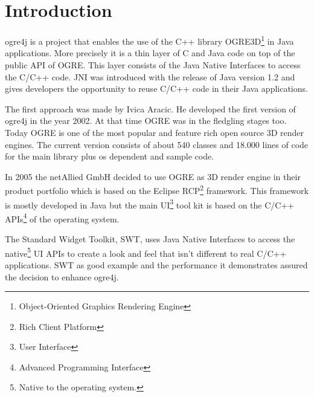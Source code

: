 \section{Introduction}
\label{Introduction}
ogre4j is a project that enables the use of the C++ library 
OGRE3D\footnote{Object-Oriented Graphics Rendering Engine} in Java 
applications. More precisely it is a thin layer of C and Java code on top of the 
public API of OGRE. This layer consists of the Java Native Interfaces to access 
the C/C++ code. JNI was introduced with the release of Java version 1.2 and 
gives developers the opportunity to reuse C/C++ code in their Java applications. 

The first approach was made by Ivica Aracic. He developed the first version of 
ogre4j in the year 2002. At that time OGRE was in the fledgling stages too. 
Today OGRE is one of the most popular and feature rich open source 3D render 
engines. The current version consists of about 540 classes and 18.000 lines of 
code for the main library plus os dependent and sample code.

In 2005 the netAllied GmbH decided to use OGRE as 3D render 
engine in their product portfolio which is based on the Eclipse 
RCP\footnote{Rich Client Platform} framework. This framework is mostly 
developed in Java but the main UI\footnote{User Interface} tool kit is based on 
the C/C++ APIs\footnote{Advanced Programming Interface} of the operating 
system. 

The Standard Widget Toolkit, SWT, uses Java Native Interfaces to access 
the native\footnote{Native to the operating system.} UI APIs to create a look 
and feel that isn't different to real C/C++ applications. SWT as good example 
and the performance it demonstrates assured the decision to enhance ogre4j.

